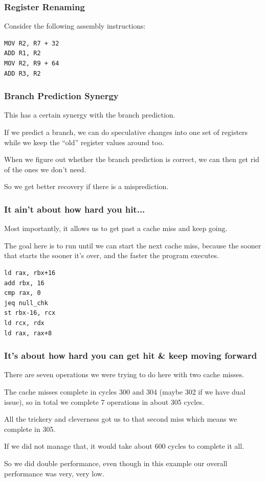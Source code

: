 \begin{frame}[fragile]
\frametitle{Register Renaming}

Consider the following assembly instructions:

\begin{verbatim}
MOV R2, R7 + 32
ADD R1, R2
MOV R2, R9 + 64
ADD R3, R2
\end{verbatim}

\end{frame}




\begin{frame}
\frametitle{Branch Prediction Synergy}

This has a certain synergy with the branch prediction. 

If we predict a branch, we can do speculative changes into one set of registers while we keep the ``old'' register values around too. 

When we figure out whether the branch prediction is correct, we can then get rid of the ones we don't need.

So we get better recovery if there is a misprediction.

\end{frame}



\begin{frame}[fragile]
\frametitle{It ain't about how hard you hit...}

Most importantly, it allows us to get past a cache miss and keep going.

The goal here is to run until we can start the next cache miss, because the sooner that starts the sooner it's over, and the faster the program executes.


\begin{verbatim}
ld rax, rbx+16
add rbx, 16
cmp rax, 0
jeq null_chk
st rbx-16, rcx
ld rcx, rdx
ld rax, rax+8
\end{verbatim}


\end{frame}



\begin{frame}
\frametitle{It's about how hard you can get hit \& keep moving forward}

There are seven operations we were trying to do here with two cache misses. 

The cache misses complete in cycles 300 and 304 (maybe 302 if we have dual issue), so in total we complete 7 operations in about 305 cycles. 

All the trickery and cleverness got us to that second miss which means we complete in 305. 

If we did not manage that, it would take about 600 cycles to complete it all. 

So we did double performance, even though in this example our overall performance was very, very low.

\end{frame}



